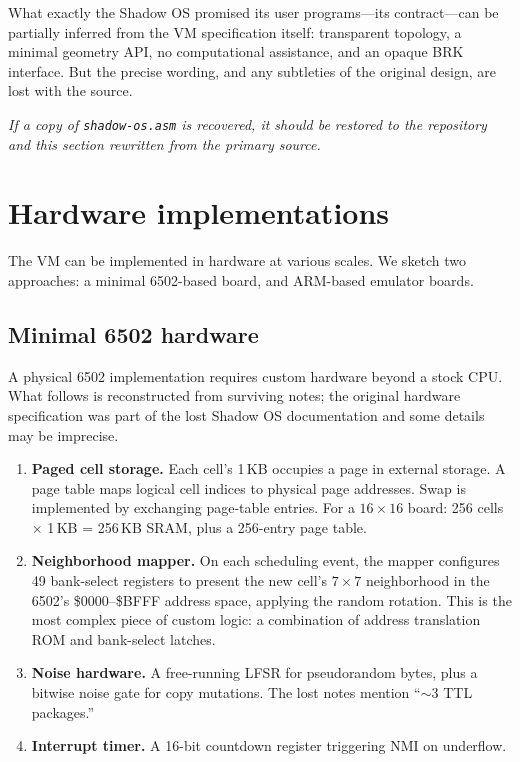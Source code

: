 \documentclass{article}
\begin{document}
What exactly the Shadow OS promised its user programs---its contract---can
be partially inferred from the VM specification itself: transparent
topology, a minimal geometry API, no computational assistance, and an
opaque BRK interface. But the precise wording, and any subtleties of
the original design, are lost with the source.

\medskip
\noindent\textit{If a copy of \texttt{shadow-os.asm} is recovered, it
should be restored to the repository and this section rewritten from
the primary source.}

\section{Hardware implementations}
\label{sec:hardware}

The VM can be implemented in hardware at various scales. We sketch two
approaches: a minimal 6502-based board, and ARM-based emulator boards.

\subsection{Minimal 6502 hardware}

A physical 6502 implementation requires custom hardware beyond a stock
CPU. What follows is reconstructed from surviving notes; the original
hardware specification was part of the lost Shadow OS documentation and
some details may be imprecise.

\begin{enumerate}
\item \textbf{Paged cell storage.}
  Each cell's 1\,KB occupies a page in external storage.
  A page table maps logical cell indices to physical page addresses.
  Swap is implemented by exchanging page-table entries.
  For a $16 \times 16$ board: 256 cells $\times$ 1\,KB = 256\,KB SRAM,
  plus a 256-entry page table.

\item \textbf{Neighborhood mapper.}
  On each scheduling event, the mapper configures 49 bank-select
  registers to present the new cell's $7 \times 7$ neighborhood in the
  6502's \$0000--\$BFFF address space, applying the random rotation.
  This is the most complex piece of custom logic: a combination of
  address translation ROM and bank-select latches.

\item \textbf{Noise hardware.}
  A free-running LFSR for pseudorandom bytes, plus a bitwise noise gate
  for copy mutations. The lost notes mention ``$\sim$3 TTL packages.''

\item \textbf{Interrupt timer.}
  A 16-bit countdown register triggering NMI on underflow.
\end{enumerate}
\end{document}
